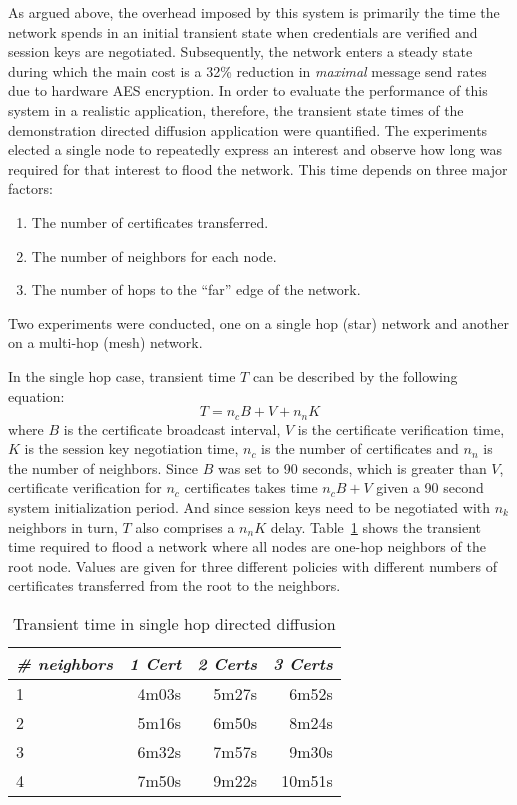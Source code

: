 As argued above, the overhead imposed by this system is primarily the time the network spends in
an initial transient state when credentials are verified and session keys are negotiated.
Subsequently, the network enters a steady state during which the main cost is a 32\% reduction
in \emph{maximal} message send rates due to hardware AES encryption. In order to evaluate the
performance of this system in a realistic application, therefore, the transient state times of
the demonstration directed diffusion application were quantified. The experiments elected a
single node to repeatedly express an interest and observe how long was required for that
interest to flood the network. This time depends on three major factors:
\begin{enumerate}
\item The number of certificates transferred.
\item The number of neighbors for each node.
\item The number of hops to the ``far'' edge of the network.
\end{enumerate}
Two experiments were conducted, one on a single hop (star) network and another on a multi-hop
(mesh) network.

In the single hop case, transient time $T$ can be described by the following equation:
\begin{displaymath}
T = n_c B + V + n_n K
\end{displaymath}
where $B$ is the certificate broadcast interval, $V$ is the certificate verification time, $K$
is the session key negotiation time, $n_c$ is the number of certificates and $n_n$ is the number
of neighbors. Since $B$ was set to 90 seconds, which is greater than $V$, certificate
verification for $n_c$ certificates takes time $n_c B + V$ given a 90 second system
initialization period. And since session keys need to be negotiated with $n_k$ neighbors in
turn, $T$ also comprises a $n_nK$ delay. Table~\ref{table-one-hop-transient} shows the transient
time required to flood a network where all nodes are one-hop neighbors of the root node. Values
are given for three different policies with different numbers of certificates transferred from
the root to the neighbors.

\begin{table}[tbhp]
  \newcommand\T{\rule{0pt}{2.1ex}}
  \centering
  \caption{Transient time in single hop directed diffusion}
  {
  \begin{tabular}{|l|r|r|r|} \hline
    \textit{\# neighbors} \T & \textit{1 Cert }
                             & \textit{2 Certs}
                             & \textit{3 Certs} \\ \hline \hline

    1 \T &  4m03s & 5m27s &  6m52s \\ \hline
    2 \T &  5m16s & 6m50s &  8m24s \\ \hline
    3 \T &  6m32s & 7m57s &  9m30s \\ \hline
    4 \T &  7m50s & 9m22s & 10m51s \\ \hline
  \end{tabular}
  }
  \label{table-one-hop-transient}
\end{table}

